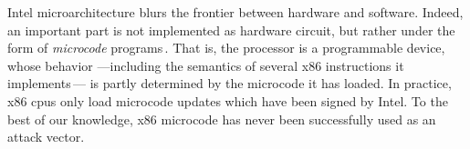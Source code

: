 Intel microarchitecture blurs the frontier between hardware and software.
%
Indeed, an important part is not implemented as hardware circuit, but rather
under the form of \emph{microcode} programs\,\cite[Section
2.14]{costan2016sgxexplained}.
%
That is, the processor is a programmable device, whose behavior ---including the
semantics of several x86 instructions it
implements\,\cite{johnson2015patentsgx}--- is partly determined by the microcode
it has loaded.
%
In practice, x86 \acp{cpu} only load microcode updates which have been signed by
Intel.
%
To the best of our knowledge, x86 microcode has never been successfully used as
an attack vector.

%

